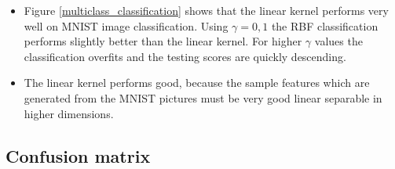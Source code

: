 \documentclass{article}
\begin{document}
\begin{itemize}

	\item Figure \ref{multiclass_classification} shows that the linear kernel performs very well on MNIST image classification. Using $\gamma = 0,1$ the RBF classification performs slightly better than the linear kernel. For higher $\gamma$ values the classification overfits and the testing scores are quickly descending.
	
	\item The linear kernel performs good, because the sample features which are generated from the MNIST pictures must be very good linear separable in higher dimensions. 

\end{itemize}

\subsection{Confusion matrix}

    \begin{figure}[hbt!]
    \begin{floatrow}
	\end{floatrow}
	\end{figure}\\
	
\end{document}

